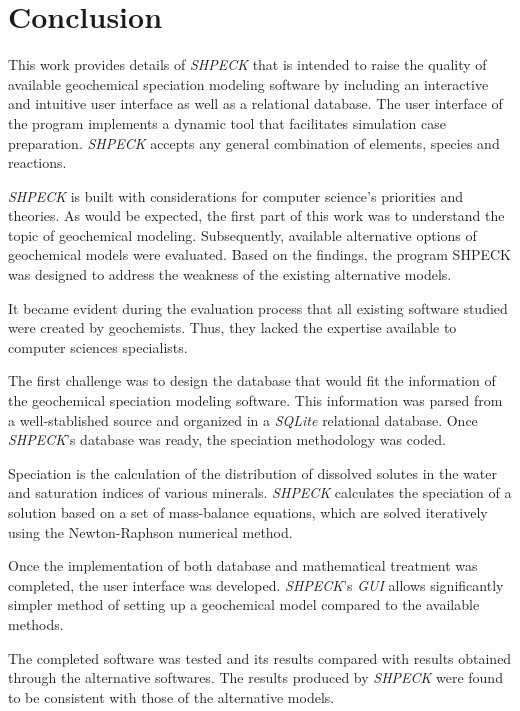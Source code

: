 
\chapter{Conclusion}
\label{chapter:conclusion}

This work provides details of \emph{SHPECK} that is intended to raise the quality of available geochemical speciation modeling software by including an interactive and intuitive user interface as well as a relational database. The user interface of the program implements a dynamic tool that facilitates simulation case preparation. \emph{SHPECK} accepts any general combination of elements, species and reactions.

\emph{SHPECK} is built with considerations for computer science's priorities and theories. As would be expected, the first part of this work was to understand the topic of geochemical modeling. Subsequently, available alternative options of geochemical models were evaluated. Based on the findings, the program SHPECK was designed to address the weakness of the existing alternative models. 

It became evident during the evaluation process that all existing software studied were created by geochemists. Thus, they lacked the expertise available to computer sciences specialists. 

The first challenge was to design the database that would fit the information of the geochemical speciation modeling software. This information was parsed from a well-stablished source and organized in a \emph{SQLite} relational database. Once \emph{SHPECK}'s database was ready, the speciation methodology was coded.

Speciation is the calculation of the distribution of dissolved solutes in the water and saturation indices of various minerals. \emph{SHPECK} calculates the speciation of a solution based on a set of mass-balance equations, which are solved iteratively using the Newton-Raphson numerical method.

Once the implementation of both database and mathematical treatment was completed, the user interface was developed. \emph{SHPECK}'s \emph{GUI} allows significantly simpler method of setting up a geochemical model compared to the available methods.

The completed software was tested and its results compared with results obtained through the alternative softwares. 
The results produced by \emph{SHPECK} were found to be consistent with those of the alternative models.

